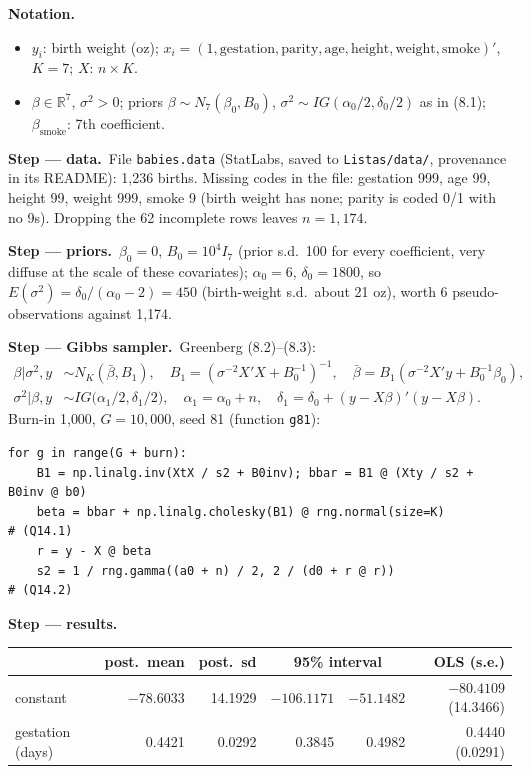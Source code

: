 \documentclass[11pt,a4paper]{article}
\newenvironment{notacao}{\par\smallskip\noindent\textbf{Notation.}\begin{itemize}[leftmargin=1.4em,topsep=1pt,itemsep=0pt]\small}{\end{itemize}}
\newcommand{\passo}[2]{\par\smallskip\noindent\textbf{Step --- #1.}~#2}
\begin{document}
\begin{sol}
\begin{notacao}
\item $y_i$: birth weight (oz); $x_i=(1,\text{gestation},\text{parity},\text{age},\text{height},\text{weight},\text{smoke})'$, $K=7$; $X$: $n\times K$.
\item $\beta\in\mathbb R^7$, $\sigma^2>0$; priors $\beta\sim N_7(\beta_0,B_0)$, $\sigma^2\sim IG(\alpha_0/2,\delta_0/2)$ as in (8.1); $\beta_{\text{smoke}}$: 7th coefficient.
\end{notacao}
\passo{data}{File \texttt{babies.data} (StatLabs, saved to \texttt{Listas/data/}, provenance in its README): 1{,}236 births. Missing codes in the file: gestation 999, age 99, height 99, weight 999, smoke 9 (birth weight has none; parity is coded 0/1 with no 9s). Dropping the 62 incomplete rows leaves $n=1{,}174$.}
\passo{priors}{$\beta_0=0$, $B_0=10^4I_7$ (prior s.d.\ 100 for every coefficient, very diffuse at the scale of these covariates); $\alpha_0=6$, $\delta_0=1800$, so $E(\sigma^2)=\delta_0/(\alpha_0-2)=450$ (birth-weight s.d.\ about 21 oz), worth 6 pseudo-observations against 1{,}174.}
\passo{Gibbs sampler}{Greenberg (8.2)--(8.3):
\begin{align}
\beta|\sigma^2,y&\sim N_K(\bar\beta,B_1),\quad B_1=(\sigma^{-2}X'X+B_0^{-1})^{-1},\quad\bar\beta=B_1(\sigma^{-2}X'y+B_0^{-1}\beta_0),\label{g81:b}\\
\sigma^2|\beta,y&\sim IG\big(\alpha_1/2,\delta_1/2\big),\quad\alpha_1=\alpha_0+n,\quad\delta_1=\delta_0+(y-X\beta)'(y-X\beta).\label{g81:s}
\end{align}
Burn-in 1{,}000, $G=10{,}000$, seed 81 (function \texttt{g81}):}
\begin{lstlisting}
for g in range(G + burn):
    B1 = np.linalg.inv(XtX / s2 + B0inv); bbar = B1 @ (Xty / s2 + B0inv @ b0)
    beta = bbar + np.linalg.cholesky(B1) @ rng.normal(size=K)         # (Q14.1)
    r = y - X @ beta
    s2 = 1 / rng.gamma((a0 + n) / 2, 2 / (d0 + r @ r))                  # (Q14.2)
\end{lstlisting}
\passo{results}{\par
\begin{center}\small
\begin{tabular}{lrrrrr}
\toprule
& post.\ mean & post.\ sd & \multicolumn{2}{c}{95\% interval} & OLS (s.e.)\\
\midrule
constant & $-78.6033$ & 14.1929 & $-106.1171$ & $-51.1482$ & $-80.4109$ (14.3466)\\
gestation (days) & 0.4421 & 0.0292 & 0.3845 & 0.4982 & 0.4440 (0.0291)\\

\end{tabular}
\end{center}}
\end{sol}
\end{document}
